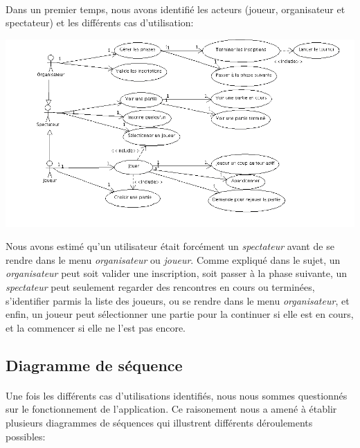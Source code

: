 \documentclass[10pt,a4paper]{report}
\begin{document}
\paragraph{}Dans un premier temps, nous avons identifié les acteurs (joueur, organisateur et spectateur) et les différents cas d'utilisation:
\begin{center}
\includegraphics[width=18cm]{Diag_d_util.png}
\end{center}
\mbox{}\hspace{0.4cm}Nous avons estimé qu'un utilisateur était forcément un \textit{spectateur} avant de se rendre dans le menu \textit{organisateur} ou \textit{joueur}. Comme expliqué dans le sujet, un \textit{organisateur} peut soit valider une inscription, soit passer à la phase suivante, un \textit{spectateur} peut seulement regarder des rencontres en cours ou terminées, s'identifier parmis la liste des joueurs, ou se rendre dans le menu \textit{organisateur}, et enfin, un joueur peut sélectionner une partie pour la continuer si elle est en cours, et la commencer si elle ne l'est pas encore.

\subsection{Diagramme de séquence}
\paragraph{}Une fois les différents cas d'utilisations identifiés, nous nous sommes questionnés sur le fonctionnement de l'application. Ce raisonement nous a amené à établir plusieurs diagrammes de séquences qui illustrent différents déroulements possibles: 
\end{document}
